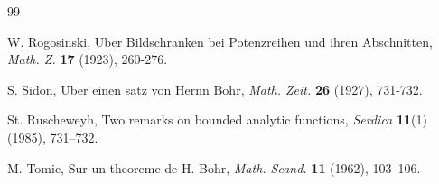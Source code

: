 \documentclass[a4paper,12pt]{amsart}
\theoremstyle{plain}
\theoremstyle{definition}
\begin{document}
\begin{thebibliography}{99}
	
	
	 {\sc W. Rogosinski}, Uber Bildschranken bei Potenzreihen und ihren Abschnitten, {\it Math. Z.} {\bf 17} (1923), 260-276.
	
	
	
	 {\sc S. Sidon}, Uber einen satz von Hernn Bohr, {\it Math. Zeit.}  {\bf 26} (1927),  731-732.
	
	
	 {\sc St. Ruscheweyh}, Two remarks on bounded analytic functions, \emph{Serdica} \textbf{11}(1) (1985), 731--732.
	
	
	
	 {\sc M. Tomic}, Sur un theoreme de H. Bohr,  {\it Math. Scand.}  {\bf 11} (1962), 103--106.
	
	
	
\end{thebibliography}
\end{document}
